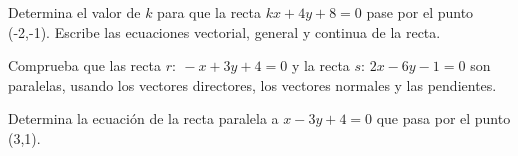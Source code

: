 \vspace{-8mm}
\begin{flushright}
\begin{footnotesize} \textcolor{gris}{}	\end{footnotesize}
\end{flushright}

\begin{mipropuesto}

Determina el valor de $k$ para que la recta $kx+4y+8=0$ pase por el punto (-2,-1). Escribe las ecuaciones vectorial, general y continua de la recta.

\end{mipropuesto}

\vspace{-8mm}
\begin{flushright}
\begin{footnotesize} \textcolor{gris}{}	\end{footnotesize}
\end{flushright}


\begin{mipropuesto}

Comprueba que las recta $r:\ -x+3y+4=0$ y la recta $s:\, 2x-6y-1=0$ son paralelas, usando los vectores directores, los vectores normales y las pendientes.

\end{mipropuesto}

\vspace{-8mm}
\begin{flushright}
\begin{footnotesize} \textcolor{gris}{}	\end{footnotesize}
\end{flushright}

\begin{mipropuesto}

Determina la ecuación de la recta paralela a $x-3y+4=0$ que pasa por el punto (3,1).

\end{mipropuesto}

\vspace{-8mm}
\begin{flushright}
\begin{footnotesize} \textcolor{gris}{}	\end{footnotesize}
\end{flushright}

